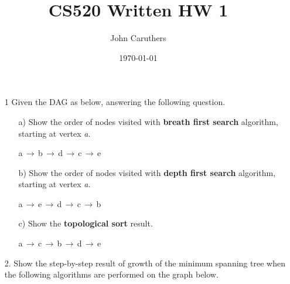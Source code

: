 \documentclass{article}
\title{CS520 Written HW 1}
\author{John Caruthers}
\date\today
\begin{document}
\maketitle

\begin{itemize}
    \item[1] Given the DAG as below, answering the following question.
        \begin{center}
        \end{center}
    \begin{itemize}
        \item[a)] Show the order of nodes visited with \textbf{breath first search} algorithm, starting at vertex \emph{a}.

        a$\,\to\,$b$\,\to\,$d$\,\to\,$c$\,\to\,$e
        
        \item[b)] Show the order of nodes visited with \textbf{depth first search} algorithm, starting at vertex \emph{a}.

        a$\,\to\,$e$\,\to\,$d$\,\to\,$c$\,\to\,$b
        
        \item[c)] Show the \textbf{topological sort} result.

        a$\,\to\,$c$\,\to\,$b$\,\to\,$d$\,\to\,$e
        
    \end{itemize}
    \item[2.] Show the step-by-step result of growth of the minimum spanning tree when the following algorithms are performed on the graph below.
    \begin{center}
        \begin{tikzpicture}
            [dot/.style = {minimum size = 0.7cm, draw, fill=gray!20, circle}]


\end{tikzpicture}
\end{center}
\end{itemize}
\end{document}
